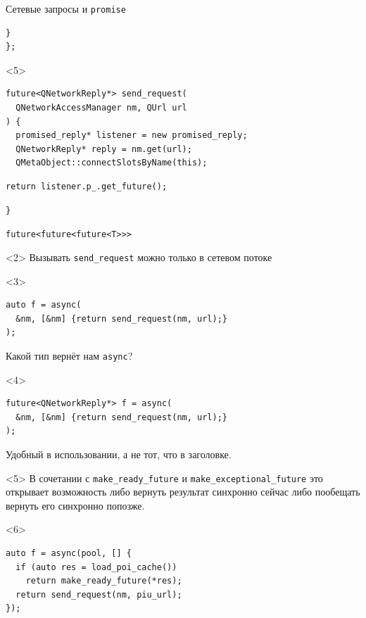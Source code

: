 \documentclass[aspectratio=169,hyperref={unicode},17pt]{beamer}
\begin{document}
\begin{frame}[fragile,t]{Сетевые запросы и \texttt{promise}}
\begin{onlyenv}
\begin{lstlisting}[style=cppcode,aboveskip=0pt,belowskip=0pt]
  }
};
\end{lstlisting}
\end{onlyenv}
\begin{onlyenv}<5>
\begin{lstlisting}[style=cppcode,aboveskip=0pt,belowskip=0pt]
future<QNetworkReply*> send_request(
  QNetworkAccessManager nm, QUrl url
) {
  promised_reply* listener = new promised_reply;
  QNetworkReply* reply = nm.get(url);
  QMetaObject::connectSlotsByName(this);
\end{lstlisting}
\begin{lstlisting}[style=cppcode,backgroundcolor=\color{gray!30},aboveskip=0pt,belowskip=0pt]
  return listener.p_.get_future();
\end{lstlisting}
\begin{lstlisting}[style=cppcode,aboveskip=0pt,belowskip=0pt]
}
\end{lstlisting}
\end{onlyenv}
\end{frame}

\begin{frame}[fragile,t]{\texttt{future<future<future<T>{}>{}>}}
\begin{onlyenv}<2>
Вызывать \texttt{send\_request} можно только в сетевом потоке
\end{onlyenv}
\begin{onlyenv}<3>
\begin{lstlisting}[style=cppcode]
auto f = async(
  &nm, [&nm] {return send_request(nm, url);}
);
\end{lstlisting}
Какой тип вернёт нам \texttt{async}?
\end{onlyenv}
\begin{onlyenv}<4>
\begin{lstlisting}[style=cppcode]
future<QNetworkReply*> f = async(
  &nm, [&nm] {return send_request(nm, url);}
);
\end{lstlisting}
Удобный в использовании, а не тот, что в заголовке.
\end{onlyenv}
\begin{onlyenv}<5>
В сочетании с \texttt{make\_ready\_future} и \texttt{make\_exceptional\_future} это открывает возможность либо вернуть результат синхронно сейчас либо пообещать вернуть его синхронно попозже.
\end{onlyenv}
\begin{onlyenv}<6>
\begin{lstlisting}[style=cppcode]
auto f = async(pool, [] {
  if (auto res = load_poi_cache())
    return make_ready_future(*res);
  return send_request(nm, piu_url);
});
\end{lstlisting}
\end{onlyenv}
\end{frame}
\end{document}
